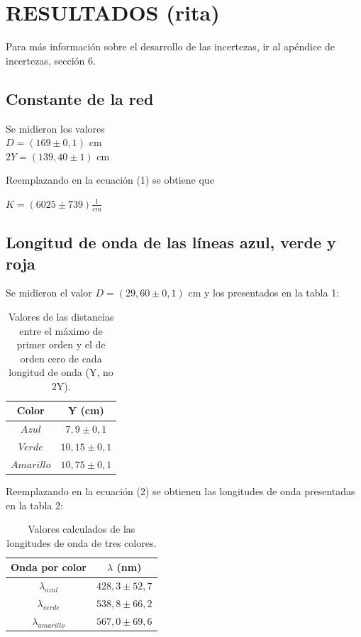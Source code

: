 \documentclass[12pt, a4paper]{article}
\begin{document}
\section{RESULTADOS (rita)}
Para más información sobre el desarrollo de las incertezas, ir al apéndice de incertezas, sección 6.

\subsection{Constante de la red}
Se midieron los valores 
\\ $D = (169 \pm 0,1)$ cm
\\ $2Y = (139,40 \pm 1)$ cm
\par Reemplazando en la ecuación (1) se obtiene que
\begin{center}
    $K = (6025 \pm 739) \frac{1}{cm}$
\end{center}

\subsection{Longitud de onda de las líneas azul, verde y roja}
Se midieron el valor $D = (29,60 \pm 0,1)$ cm y los presentados en la tabla 1:

\begin{table}[H]
  \centering
  \begin{tabular}{|c|c|}
  \hline
  Color & Y (cm) \\
  \hline
  $Azul$  & $7,9 \pm 0,1$  \\ \hline
  $Verde$  & $10,15 \pm 0,1$ \\ \hline
  $Amarillo$  & $10,75 \pm 0,1$ \\ \hline
  \end{tabular}
  \caption{\centering Valores de las distancias entre el máximo de primer orden y el de orden cero de cada longitud de onda (Y, no 2Y).}
  \label{tabla1}
\end{table}

Reemplazando en la ecuación (2) se obtienen las longitudes de onda presentadas en la tabla 2:

\begin{table}[H]
  \centering
  \begin{tabular}{|c|c|}
  \hline
  Onda por color & $\lambda $ (nm)  \\
  \hline
  ${\lambda_{azul}}$  & $ 428,3 \pm 52,7$  \\ \hline
  ${\lambda_{verde}}$  & $ 538,8 \pm 66,2 $ \\ \hline
  ${\lambda_{amarillo}}$  & $ 567,0 \pm 69,6 $\\ \hline
  \end{tabular}
  \caption{\centering Valores calculados de las longitudes de onda de tres colores. }
  \label{tabla2}
\end{table}
\end{document}
